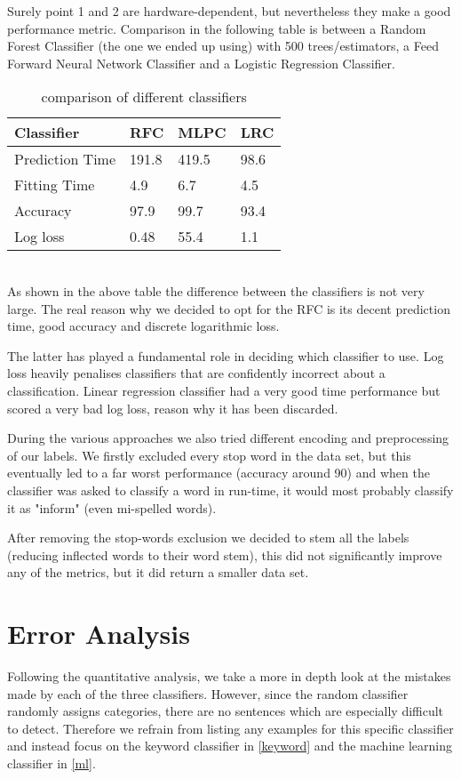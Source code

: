 \documentclass[a4paper]{article}
\begin{document}
Surely point 1 and 2 are hardware-dependent, but nevertheless they make a good performance metric.
Comparison in the following table is between a Random Forest Classifier (the one we ended up using) with 500 trees/estimators, a Feed Forward Neural Network Classifier and a Logistic Regression Classifier.

\begin{table}[h!]
    \centering
    \begin{tabular}{l|l|l|l}
     Classifier & RFC & MLPC & LRC \\ \hline
     Prediction Time & 191.8 & 419.5 & 98.6 \\ \hline
     Fitting Time & 4.9 & 6.7 & 4.5 \\ \hline Accuracy & 97.9 & 99.7 & 93.4 \\ \hline Log loss & 0.48 & 55.4 & 1.1
    \end{tabular}
    \caption{comparison of different classifiers}
    \label{table0}
\end{table}{} \\

As shown in the above table the difference between the classifiers is not very large. The real reason why we decided to opt for the RFC is its decent prediction time, good accuracy and discrete logarithmic loss. 

The latter has played a fundamental role in deciding which classifier to use. Log loss heavily penalises classifiers that are confidently incorrect about a classification. 
Linear regression classifier had a very good time performance but scored a very bad log loss, reason why it has been discarded.

During the various approaches we also tried different encoding and preprocessing of our labels. We firstly excluded every stop word in the data set, but this eventually led to a far worst performance (accuracy around 90) and when the classifier was asked to classify a word in run-time, it would most probably classify it as "inform" (even mi-spelled words).

After removing the stop-words exclusion we decided to stem all the labels (reducing inflected words to their word stem), this did not significantly improve any of the metrics, but it did return a smaller data set. 

\section{Error Analysis}
Following the quantitative analysis, we take a more in depth look at the mistakes made by each of the three classifiers. However, since the random classifier randomly assigns categories, there are no sentences which are especially difficult to detect. Therefore we refrain from listing any examples for this specific classifier and instead focus on the keyword classifier in \autoref{keyword} and the machine learning classifier in \autoref{ml}.
\end{document}
